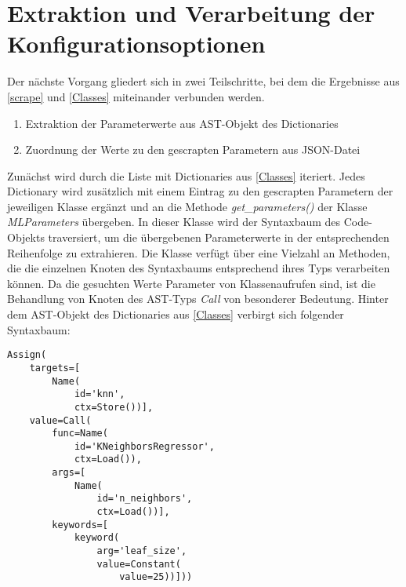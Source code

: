 \documentclass[german,bachelor]{swsLeipzig}
\begin{document}
\section{Extraktion und Verarbeitung der Konfigurationsoptionen} \label{Parameters}
Der nächste Vorgang gliedert sich in zwei Teilschritte, bei dem die Ergebnisse aus \ref{scrape} und \ref{Classes} miteinander
verbunden werden.

\begin{enumerate}
 \item Extraktion der Parameterwerte aus AST-Objekt des Dictionaries
 \item Zuordnung der Werte zu den gescrapten Parametern aus JSON-Datei
\end{enumerate}

Zunächst wird durch die Liste mit Dictionaries aus \ref{Classes} iteriert.
Jedes Dictionary wird zusätzlich mit einem Eintrag zu den gescrapten Parametern der jeweiligen Klasse ergänzt und an die Methode \textit{get\_parameters()}
der Klasse \textit{MLParameters} übergeben.
In dieser Klasse wird der Syntaxbaum des Code-Objekts traversiert, um die übergebenen Parameterwerte in der
entsprechenden Reihenfolge zu extrahieren.
Die Klasse verfügt über eine Vielzahl an Methoden, die die einzelnen Knoten des Syntaxbaums entsprechend ihres Typs
verarbeiten können.
Da die gesuchten Werte Parameter von Klassenaufrufen sind, ist die Behandlung von Knoten des AST-Typs \textit{Call} von
besonderer Bedeutung.
Hinter dem AST-Objekt des Dictionaries aus \ref{Classes} verbirgt sich folgender Syntaxbaum: \\

\noindent\begin{minipage}{\linewidth}
\begin{lstlisting}[frame=single, label=class_dict, basicstyle=\small, caption={AST der KNeighborsRegressor-Klasse},captionpos=b]
Assign(
    targets=[
        Name(
            id='knn',
            ctx=Store())],
    value=Call(
        func=Name(
            id='KNeighborsRegressor',
            ctx=Load()),
        args=[
            Name(
                id='n_neighbors',
                ctx=Load())],
        keywords=[
            keyword(
                arg='leaf_size',
                value=Constant(
                    value=25))]))
\end{lstlisting}
\end{minipage}
\
\end{document}
